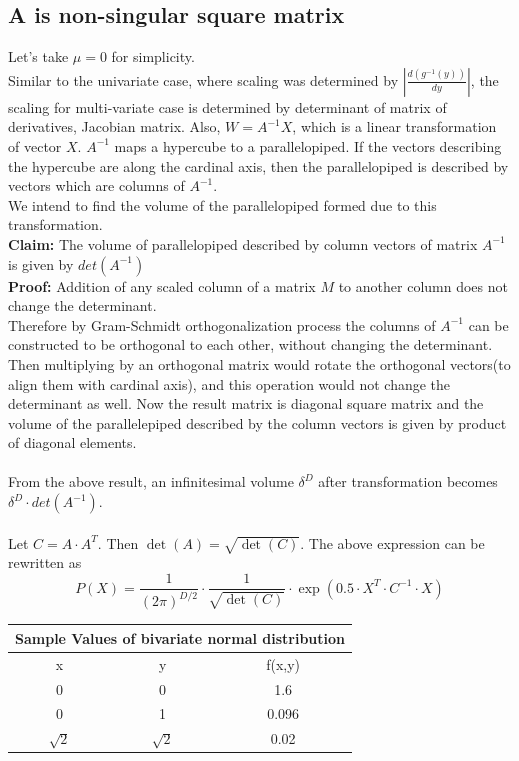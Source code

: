 \documentclass{article}
\begin{document}
\subsection{A is non-singular square matrix}
Let's take $\mu = 0$ for simplicity.\\
Similar to the univariate case, where scaling was determined by $\left|\frac{d(g^{-1}(y))}{dy}\right|$, the scaling for multi-variate case is determined by determinant of matrix of derivatives, Jacobian matrix.
Also, $W=A^{-1}X$, which is a linear transformation of vector $X$. $A^{-1}$ maps a hypercube to a parallelopiped. If the vectors describing the hypercube are along the cardinal axis, then the parallelopiped is described by vectors which are columns of $A^{-1}$.\\
We intend to find the volume of the parallelopiped formed due to this transformation.\\
\textbf{Claim: }The volume of parallelopiped described by column vectors of matrix $A^{-1}$ is given by $det({A^{-1}})$\\
\textbf{Proof: }Addition of any scaled column of a matrix $M$ to another column does not change the determinant.\\
Therefore by Gram-Schmidt orthogonalization process the columns of $A^{-1}$ can be constructed to be orthogonal to each other, without changing the determinant. Then multiplying by an orthogonal matrix would rotate the orthogonal vectors(to align them with cardinal axis), and this operation would not change the determinant as well. Now the result matrix is diagonal square matrix and the volume of the parallelepiped described by the column vectors is given by product of diagonal elements.\\
\\
From the above result, an infinitesimal volume $\delta^{D}$ after transformation becomes $\delta^{D} \cdot det(A^{-1})$.\\
\\
Let $C=A \cdot A^T$. Then $\det(A) = \sqrt{\det(C)}$. The above expression can be rewritten as
\begin{equation}
    P(X) = \frac{1}{(2\pi)^{D/2}}\cdot \frac{1}{\sqrt{\det(C)}} \cdot \exp(0.5 \cdot X^T \cdot C^{-1} \cdot X)
\end{equation}
\begin{tabular}{|c|c||c|}
\hline
\multicolumn{3}{|c|}{Sample Values of bivariate normal distribution}\\
\hline
x & y & f(x,y)\\
\hline
 0 & 0   &  1.6\\
0   &  1 & 0.096 \\
$\sqrt{2}$ & $\sqrt{2}$ & 0.02 \\
\hline
\end{tabular}

\printbibliography
\end{document}
